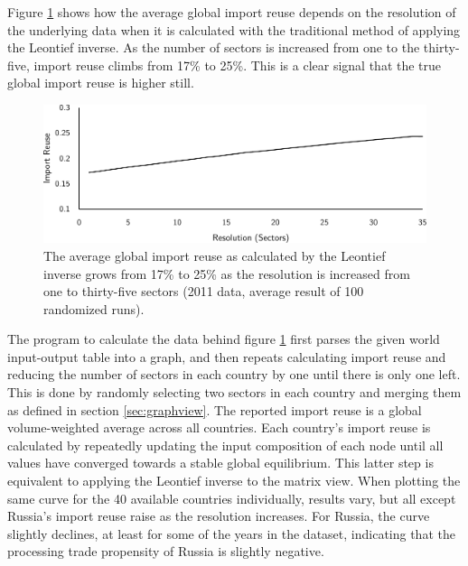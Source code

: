 \documentclass[english]{uzhpub}
\begin{document}
Figure \ref{fig:varying} shows how the average global import reuse depends on the resolution of the underlying data when it is calculated with the traditional method of applying the Leontief inverse. As the number of sectors is increased from one to the thirty-five, import reuse climbs from 17\% to 25\%. This is a clear signal that the true global import reuse is higher still.

\begin{figure}
\centering
\includegraphics[scale=0.8]{../results/resolution}
\caption{The average global import reuse as calculated by the Leontief inverse grows from 17\% to 25\% as the resolution is increased from one to thirty-five sectors (2011 data, average result of 100 randomized runs).} \label{fig:varying}
\end{figure}

The program to calculate the data behind figure \ref{fig:varying} first parses the given world input-output table into a graph, and then repeats calculating import reuse and reducing the number of sectors in each country by one until there is only one left. This is done by randomly selecting two sectors in each country and merging them as defined in section \ref{sec:graphview}. The reported import reuse is a global volume-weighted average across all countries. Each country's import reuse is calculated by repeatedly updating the input composition of each node until all values have converged towards a stable global equilibrium. This latter step is equivalent to applying the Leontief inverse to the matrix view. When plotting the same curve for the 40 available countries individually, results vary, but all except Russia's import reuse raise as the resolution increases. For Russia, the curve slightly declines, at least for some of the years in the dataset, indicating that the processing trade propensity of Russia is slightly negative.
\end{document}
